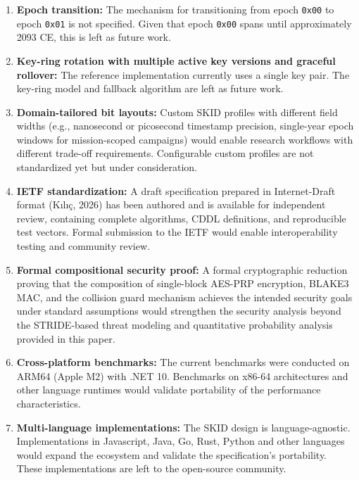 \documentclass[fleqn,10pt,lineno]{wlpeerj}
\begin{document}
\begin{enumerate}
\def\labelenumi{\arabic{enumi}.}
\item
  \textbf{Epoch transition:} The mechanism for transitioning from epoch
  \texttt{0x00} to epoch \texttt{0x01} is not specified. Given that
  epoch \texttt{0x00} spans until approximately 2093 CE, this is left as
  future work.
\item
  \textbf{Key-ring rotation with multiple active key versions and
  graceful rollover:} The reference implementation currently uses a
  single key pair. The key-ring model and fallback algorithm are left as
  future work.
\item
  \textbf{Domain-tailored bit layouts:} Custom SKID profiles with
  different field widths (e.g., nanosecond or picosecond timestamp
  precision, single-year epoch windows for mission-scoped campaigns)
  would enable research workflows with different trade-off requirements.
  Configurable custom profiles are not standardized yet but under
  consideration.
\item
  \textbf{IETF standardization:} A draft specification prepared in
  Internet-Draft format (Kılıç, 2026) has been authored and is available
  for independent review, containing complete algorithms, CDDL
  definitions, and reproducible test vectors. Formal submission to the
  IETF would enable interoperability testing and community review.
\item
  \textbf{Formal compositional security proof:} A formal cryptographic
  reduction proving that the composition of single-block AES-PRP
  encryption, BLAKE3 MAC, and the collision guard mechanism achieves the
  intended security goals under standard assumptions would strengthen
  the security analysis beyond the STRIDE-based threat modeling and
  quantitative probability analysis provided in this paper.
\item
  \textbf{Cross-platform benchmarks:} The current benchmarks were
  conducted on ARM64 (Apple M2) with .NET 10. Benchmarks on x86-64
  architectures and other language runtimes would validate portability
  of the performance characteristics.
\item
  \textbf{Multi-language implementations:} The SKID design is
  language-agnostic. Implementations in Javascript, Java, Go, Rust,
  Python and other languages would expand the ecosystem and validate the
  specification's portability. These implementations are left to the
  open-source community.
\end{enumerate}
\end{document}
